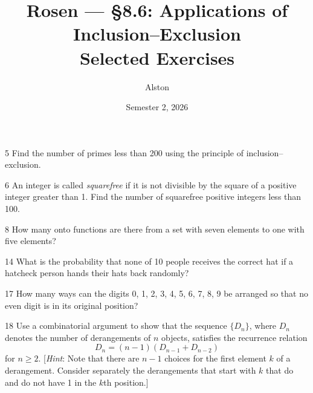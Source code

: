 \documentclass[11pt]{article}
\title{Rosen --- \S 8.6: Applications of Inclusion--Exclusion\\ \large Selected Exercises}
\author{Alston}
\date{Semester 2, 2026}
\begin{document}
\maketitle

\begin{exercise}{5}
    Find the number of primes less than 200 using the principle of
    inclusion--exclusion.
\end{exercise}

\begin{exercise}{6}
    An integer is called \emph{squarefree} if it is not divisible by
    the square of a positive integer greater than 1. Find the number
    of squarefree positive integers less than 100.
\end{exercise}

\begin{exercise}{8}
    How many onto functions are there from a set with seven elements
    to one with five elements?
\end{exercise}

\begin{exercise}{14}
    What is the probability that none of 10 people receives the
    correct hat if a hatcheck person hands their hats back randomly?
\end{exercise}

\begin{exercise}{17}
    How many ways can the digits 0, 1, 2, 3, 4, 5, 6, 7, 8, 9 be
    arranged so that no even digit is in its original position?
\end{exercise}

\begin{exercise}{18}
    Use a combinatorial argument to show that the sequence $\{D_n\}$,
    where $D_n$ denotes the number of derangements of $n$ objects,
    satisfies the recurrence relation
    \[
    D_n = (n-1)(D_{n-1} + D_{n-2})
    \]
    for $n \geq 2$.
    [\emph{Hint}: Note that there are $n-1$ choices for the first
    element $k$ of a derangement. Consider separately the derangements
    that start with $k$ that do and do not have 1 in the $k$th
    position.]
\end{exercise}
\end{document}
